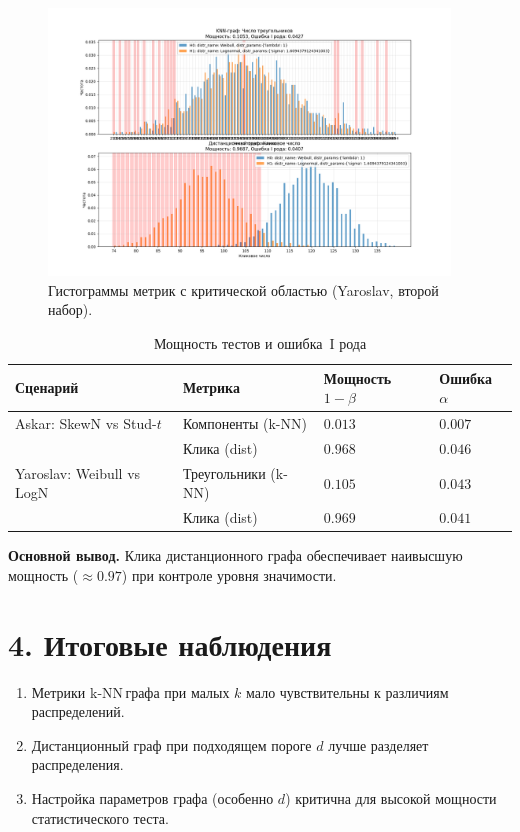\documentclass[a4paper,12pt]{article}
\begin{document}
\begin{figure}[H]
    \centering
    \includegraphics[width=0.95\textwidth]{part3_results_1_Yaroslav.png}
    \caption{Гистограммы метрик с критической областью (Yaroslav, второй набор).}
    \label{fig:part3-1-yaroslav}
\end{figure}

\begin{table}[H]
    \centering
    \caption{Мощность тестов и ошибка~I рода}
    \label{tab:power}
    \begin{tabular}{@{}llll@{}}
        \toprule
        Сценарий & Метрика & Мощность $1-\beta$ & Ошибка $\alpha$ \\
        \midrule
        Askar: SkewN vs Stud-$t$ & Компоненты (k-NN) & $0.013$ & $0.007$ \\
        & Клика (dist) & $0.968$ & $0.046$ \\
        Yaroslav: Weibull vs LogN & Треугольники (k-NN) & $0.105$ & $0.043$ \\
        & Клика (dist) & $0.969$ & $0.041$ \\
        \bottomrule
    \end{tabular}
\end{table}

\noindent\textbf{Основной вывод.} Клика дистанционного графа обеспечивает наивысшую мощность (\(\approx0.97\)) при контроле уровня значимости.

\section*{4. Итоговые наблюдения}

\begin{enumerate}
    \item Метрики k\nobreakdash-NN\,графа при малых $k$ мало чувствительны к различиям распределений.
    \item Дистанционный граф при подходящем пороге $d$ лучше разделяет распределения.
    \item Настройка параметров графа (особенно $d$) критична для высокой мощности статистического теста.
\end{enumerate}
\end{document}
